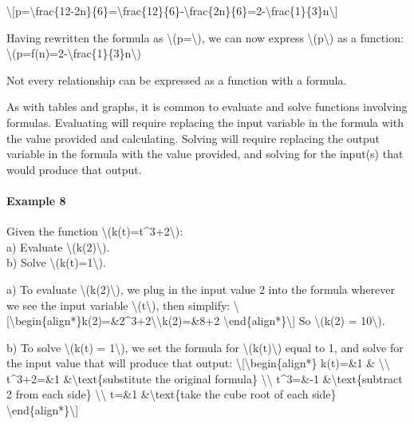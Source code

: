 \textbackslash{}{[}p=\textbackslash{}frac\{12-2n\}\{6\}=\textbackslash{}frac\{12\}\{6\}-\textbackslash{}frac\{2n\}\{6\}=2-\textbackslash{}frac\{1\}\{3\}n\textbackslash{}{]}

Having rewritten the formula as \textbackslash{}(p=\textbackslash{}), we
can now express \textbackslash{}(p\textbackslash{}) as a function:
\textbackslash{}(p=f(n)=2-\textbackslash{}frac\{1\}\{3\}n\textbackslash{})

Not every relationship can be expressed as a function with a formula.

As with tables and graphs, it is common to evaluate and solve functions
involving formulas. Evaluating will require replacing the input variable
in the formula with the value provided and calculating. Solving will
require replacing the output variable in the formula with the value
provided, and solving for the input(s) that would produce that output.

\hypertarget{example-8}{%
\paragraph{Example 8}\label{example-8}}

Given the function \textbackslash{}(k(t)=t\^{}3+2\textbackslash{}):\\
a) Evaluate \textbackslash{}(k(2)\textbackslash{}).\\
b) Solve \textbackslash{}(k(t)=1\textbackslash{}).

a) To evaluate \textbackslash{}(k(2)\textbackslash{}), we plug in the
input value 2 into the formula wherever we see the input variable
\textbackslash{}(t\textbackslash{}), then simplify:
\textbackslash{}{[}\textbackslash{}begin\{align*\}k(2)=\&2\^{}3+2\textbackslash{}\textbackslash{}k(2)=\&8+2
\textbackslash{}end\{align*\}\textbackslash{}{]} So
\textbackslash{}(k(2) = 10\textbackslash{}).

b) To solve \textbackslash{}(k(t) = 1\textbackslash{}), we set the
formula for \textbackslash{}(k(t)\textbackslash{}) equal to 1, and solve
for the input value that will produce that output:
\textbackslash{}{[}\textbackslash{}begin\{align*\} k(t)=\&1 \&
\textbackslash{}\textbackslash{} t\^{}3+2=\&1
\&\textbackslash{}text\{substitute the original formula\}
\textbackslash{}\textbackslash{} t\^{}3=\&-1
\&\textbackslash{}text\{subtract 2 from each side\}
\textbackslash{}\textbackslash{} t=\&1 \&\textbackslash{}text\{take the
cube root of each side\}
\textbackslash{}end\{align*\}\textbackslash{}{]}

